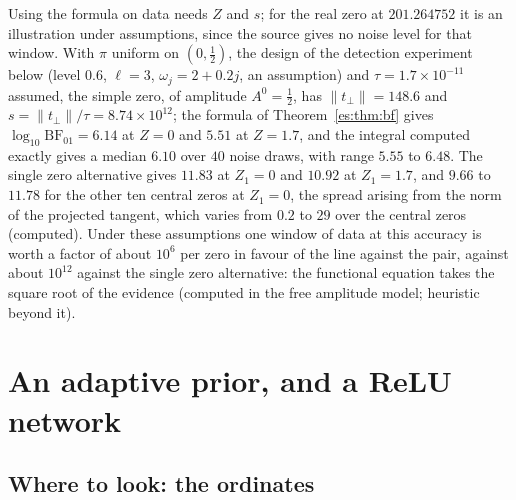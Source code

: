 Using the formula on data needs $Z$ and $s$; for the real zero at $201.264752$ it is an illustration under assumptions, since the source gives no noise level for that window. With $\pi$ uniform on $(0,\tfrac12)$, the design of the detection experiment below (level $0.6$, $\ell=3$, $\omega_j=2+0.2j$, an assumption) and $\tau=1.7\times10^{-11}$ assumed, the simple zero, of amplitude $A^0=\tfrac12$, has $\|t_\perp\|=148.6$ and $s=\|t_\perp\|/\tau=8.74\times10^{12}$; the formula of Theorem~\ref{es:thm:bf} gives $\log_{10}\mathrm{BF}_{01}=6.14$ at $Z=0$ and $5.51$ at $Z=1.7$, and the integral computed exactly gives a median $6.10$ over $40$ noise draws, with range $5.55$ to $6.48$. The single zero alternative gives $11.83$ at $Z_1=0$ and $10.92$ at $Z_1=1.7$, and $9.66$ to $11.78$ for the other ten central zeros at $Z_1=0$, the spread arising from the norm of the projected tangent, which varies from $0.2$ to $29$ over the central zeros (computed). Under these assumptions one window of data at this accuracy is worth a factor of about $10^6$ per zero in favour of the line against the pair, against about $10^{12}$ against the single zero alternative: the functional equation takes the square root of the evidence (computed in the free amplitude model; heuristic beyond it).

\section{An adaptive prior, and a ReLU network}\label{es:sec:adaptive}

\subsection{Where to look: the ordinates}

